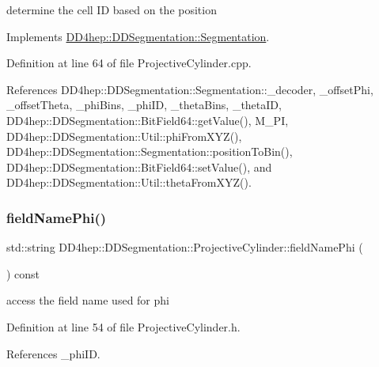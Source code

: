 determine the cell ID based on the position 



Implements \hyperlink{class_d_d4hep_1_1_d_d_segmentation_1_1_segmentation_ad5a60953d96d409850d8192f64f8ce3c}{D\+D4hep\+::\+D\+D\+Segmentation\+::\+Segmentation}.



Definition at line 64 of file Projective\+Cylinder.\+cpp.



References D\+D4hep\+::\+D\+D\+Segmentation\+::\+Segmentation\+::\+\_\+decoder, \+\_\+offset\+Phi, \+\_\+offset\+Theta, \+\_\+phi\+Bins, \+\_\+phi\+ID, \+\_\+theta\+Bins, \+\_\+theta\+ID, D\+D4hep\+::\+D\+D\+Segmentation\+::\+Bit\+Field64\+::get\+Value(), M\+\_\+\+PI, D\+D4hep\+::\+D\+D\+Segmentation\+::\+Util\+::phi\+From\+X\+Y\+Z(), D\+D4hep\+::\+D\+D\+Segmentation\+::\+Segmentation\+::position\+To\+Bin(), D\+D4hep\+::\+D\+D\+Segmentation\+::\+Bit\+Field64\+::set\+Value(), and D\+D4hep\+::\+D\+D\+Segmentation\+::\+Util\+::theta\+From\+X\+Y\+Z().

\hypertarget{class_d_d4hep_1_1_d_d_segmentation_1_1_projective_cylinder_a70a373f8532677593f46083a45dde6c5}{}\label{class_d_d4hep_1_1_d_d_segmentation_1_1_projective_cylinder_a70a373f8532677593f46083a45dde6c5} 
\subsubsection{\texorpdfstring{field\+Name\+Phi()}{fieldNamePhi()}}
{\footnotesize\ttfamily std\+::string D\+D4hep\+::\+D\+D\+Segmentation\+::\+Projective\+Cylinder\+::field\+Name\+Phi (\begin{DoxyParamCaption}{ }\end{DoxyParamCaption}) const\hspace{0.3cm}{\ttfamily [inline]}}



access the field name used for phi 



Definition at line 54 of file Projective\+Cylinder.\+h.



References \+\_\+phi\+ID.

